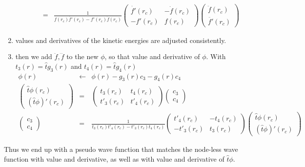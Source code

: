 \documentclass[11pt,a4paper]{report}
\begin{document}
\begin{enumerate}
\begin{enumerate}
\begin{eqnarray}
&=&
\frac{1}{f(r_c)\dot{f'}(r_c)-f'(r_c)\dot{f}(r_c)}
\left(\begin{array}{cc}\dot{f'}(r_c)&-\dot{f}(r_c)\\-f'(r_c)&f(r_c)\end{array}\right)
\left(\begin{array}{c}\ddot{f}(r_c)\\\ddot{f'}(r_c)\end{array}\right)
\end{eqnarray}
\end{enumerate}
\item values and derivatives of the kinetic energies are adjusted
  consistently.
\item then we add $\ddot{f},\dddot{f}$ to the new $\phi$, so that
  value and derivative of $\phi$. With $t_3(r)=\hat{t}g_3(r)$ and
  $t_4(r)=\hat{t}g_4(r)$
\begin{eqnarray}
\phi(r)&\leftarrow&\phi(r)-g_3(r)c_3 - g_4(r)c_4
\nonumber\\
\left(\begin{array}{c}
\hat{t}\phi(r_c)
\\
(\hat{t}\phi)'(r_c)
\end{array}\right)
&=&
\left(\begin{array}{cc}t_3(r_c)&t_4(r_c)\\
t'_3(r_c)&t'_4(r_c)\end{array}\right)
\left(\begin{array}{c}c_3\\c_4\end{array}\right)
\nonumber\\
\left(\begin{array}{c}c_3\\c_4\end{array}\right)
&=&
\frac{1}{t_3(r_c)t'_4(r_c)-t'_3(r_c)t_4(r_c)}
\left(\begin{array}{cc}t'_4(r_c)&-t_4(r_c)\\
-t'_3(r_c)&t_3(r_c)\end{array}\right)
\left(\begin{array}{c}\hat{t}\phi(r_c)\\(\hat{t}\phi)'(r_c)\end{array}\right)
\end{eqnarray}
\end{enumerate}
Thus we end up with a pseudo wave function that matches the node-less
wave function with value and derivative, as well as with value and
derivative of $\hat{t}\phi$.
\end{document}
